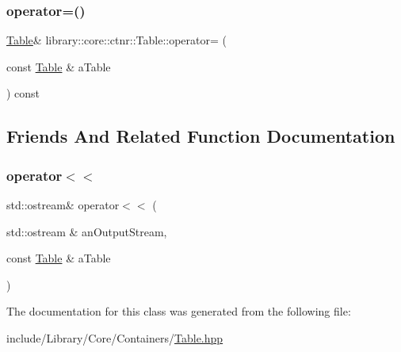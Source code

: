\subsubsection{\texorpdfstring{operator=()}{operator=()}}
{\footnotesize\ttfamily \hyperlink{classlibrary_1_1core_1_1ctnr_1_1_table}{Table}\& library\+::core\+::ctnr\+::\+Table\+::operator= (\begin{DoxyParamCaption}\item[{const \hyperlink{classlibrary_1_1core_1_1ctnr_1_1_table}{Table} \&}]{a\+Table }\end{DoxyParamCaption}) const}



\subsection{Friends And Related Function Documentation}
\mbox{\label{classlibrary_1_1core_1_1ctnr_1_1_table_afaece709b2f143e4011941ae67b7adba}} 
\subsubsection{\texorpdfstring{operator$<$$<$}{operator<<}}
{\footnotesize\ttfamily std\+::ostream\& operator$<$$<$ (\begin{DoxyParamCaption}\item[{std\+::ostream \&}]{an\+Output\+Stream,  }\item[{const \hyperlink{classlibrary_1_1core_1_1ctnr_1_1_table}{Table} \&}]{a\+Table }\end{DoxyParamCaption})\hspace{0.3cm}{\ttfamily [friend]}}



The documentation for this class was generated from the following file\+:\begin{DoxyCompactItemize}
\item 
include/\+Library/\+Core/\+Containers/\hyperlink{_table_8hpp}{Table.\+hpp}\end{DoxyCompactItemize}

